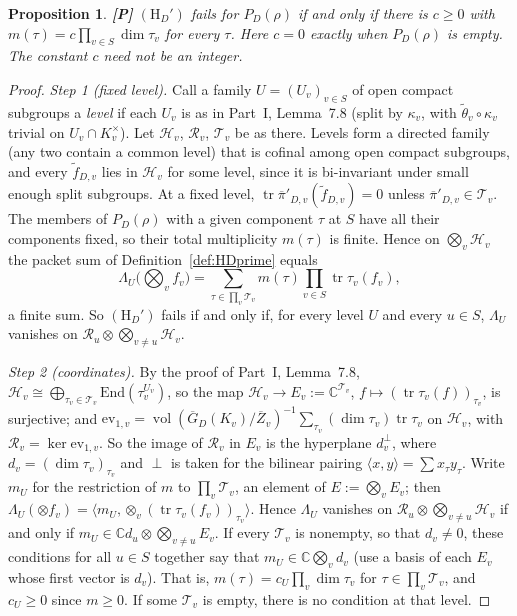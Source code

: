\documentclass[12pt]{article}
\newcommand{\ov}[1]{\overline{#1}}
\newcommand{\C}{\mathbb{C}}
\newcommand{\tr}{\operatorname{tr}}
\newcommand{\vol}{\operatorname{vol}}
\newcommand{\Zb}{\ov{Z}}
\newcommand{\GDb}{\ov{G}_D}
\newcommand{\pib}{\ov{\pi}}
\newcommand{\Pv}{\textbf{[P]}}
\theoremstyle{plain}
\newtheorem{proposition}[theorem]{Proposition}
\theoremstyle{definition}
\begin{document}
\begin{proposition}\label{prop:cancel2}\Pv
$(\mathrm H_D')$ fails for $P_D(\rho)$ if and only if there is $c\ge0$ with $m(\tau)=c\prod_{v\in S}\dim\tau_v$ for every $\tau$. Here $c=0$ exactly when $P_D(\rho)$ is empty. The constant $c$ need not be an integer.
\end{proposition}
\begin{proof}
\emph{Step 1 (fixed level).} Call a family $U=(U_v)_{v\in S}$ of open compact subgroups a \emph{level} if each $U_v$ is as in Part~I, Lemma~7.8 (split by $\kappa_v$, with $\tilde\theta_v\circ\kappa_v$ trivial on $U_v\cap K_v^\times$). Let $\mathcal H_v$, $\mathcal R_v$, $\mathcal T_v$ be as there. Levels form a directed family (any two contain a common level) that is cofinal among open compact subgroups, and every $\tilde f_{D,v}$ lies in $\mathcal H_v$ for some level, since it is bi-invariant under small enough split subgroups. At a fixed level, $\tr\pib'_{D,v}(\tilde f_{D,v})=0$ unless $\pib'_{D,v}\in\mathcal T_v$. The members of $P_D(\rho)$ with a given component $\tau$ at $S$ have all their components fixed, so their total multiplicity $m(\tau)$ is finite. Hence on $\bigotimes_v\mathcal H_v$ the packet sum of Definition~\ref{def:HDprime} equals
\[ \Lambda_U\big(\textstyle\bigotimes_v f_v\big)=\sum_{\tau\in\prod_v\mathcal T_v}m(\tau)\prod_{v\in S}\tr\tau_v(f_v), \]
a finite sum. So $(\mathrm H_D')$ fails if and only if, for every level $U$ and every $u\in S$, $\Lambda_U$ vanishes on $\mathcal R_u\otimes\bigotimes_{v\ne u}\mathcal H_v$.

\emph{Step 2 (coordinates).} By the proof of Part~I, Lemma~7.8, $\mathcal H_v\cong\bigoplus_{\tau_v\in\mathcal T_v}\mathrm{End}(\tau_v^{U_v})$, so the map $\mathcal H_v\to E_v:=\C^{\mathcal T_v}$, $f\mapsto(\tr\tau_v(f))_{\tau_v}$, is surjective; and $\mathrm{ev}_{1,v}=\vol(\GDb(K_v)/\Zb_v)^{-1}\sum_{\tau_v}(\dim\tau_v)\tr\tau_v$ on $\mathcal H_v$, with $\mathcal R_v=\ker\mathrm{ev}_{1,v}$. So the image of $\mathcal R_v$ in $E_v$ is the hyperplane $d_v^\perp$, where $d_v=(\dim\tau_v)_{\tau_v}$ and $\perp$ is taken for the bilinear pairing $\langle x,y\rangle=\sum x_\tau y_\tau$. Write $m_U$ for the restriction of $m$ to $\prod_v\mathcal T_v$, an element of $E:=\bigotimes_vE_v$; then $\Lambda_U(\otimes f_v)=\langle m_U,\otimes_v(\tr\tau_v(f_v))_{\tau_v}\rangle$. Hence $\Lambda_U$ vanishes on $\mathcal R_u\otimes\bigotimes_{v\ne u}\mathcal H_v$ if and only if $m_U\in\C d_u\otimes\bigotimes_{v\ne u}E_v$. If every $\mathcal T_v$ is nonempty, so that $d_v\ne0$, these conditions for all $u\in S$ together say that $m_U\in\C\bigotimes_vd_v$ (use a basis of each $E_v$ whose first vector is $d_v$). That is, $m(\tau)=c_U\prod_v\dim\tau_v$ for $\tau\in\prod_v\mathcal T_v$, and $c_U\ge0$ since $m\ge0$. If some $\mathcal T_v$ is empty, there is no condition at that level.


\end{proof}
\end{document}
